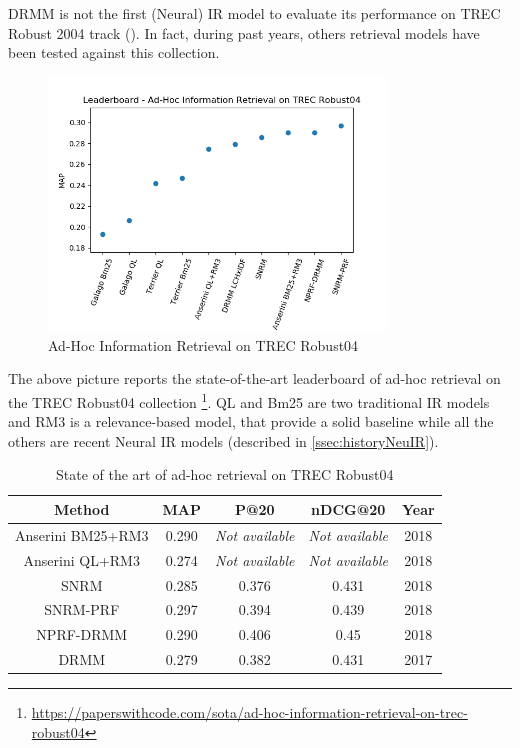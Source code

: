DRMM is not the first (Neural) IR model to evaluate its performance on TREC Robust 2004 track (\cite{rob04}). In fact, during past years, others retrieval models have been tested against this collection.

\begin{figure}[H]
  \centering
  \includegraphics[width=0.8\textwidth]{res/img/EvalRobust04.png}
  \caption{Ad-Hoc Information Retrieval on TREC Robust04}
  \label{fig:evalRob04}
\end{figure}

The above picture reports the state-of-the-art leaderboard of ad-hoc retrieval on the TREC Robust04 collection \footnote{\url{https://paperswithcode.com/sota/ad-hoc-information-retrieval-on-trec-robust04}}.
QL and Bm25 are two traditional IR models and RM3 is a relevance-based model, that provide a solid baseline while all the others are recent Neural IR models (described in \ref{ssec:historyNeuIR}).

\begin{table}[H]
\centering
\begin{tabular}{ccccc}
\textbf{Method} & \textbf{MAP} & \textbf{P@20} & \textbf{nDCG@20} & \textbf{Year} \\ \hline
Anserini BM25+RM3 & 0.290 & \textit{Not available} & \textit{Not available} & 2018 \\ \hline
Anserini QL+RM3 & 0.274 & \textit{Not available} & \textit{Not available} & 2018 \\ \hline
SNRM & 0.285 & 0.376 & 0.431 & 2018 \\ \hline
SNRM-PRF & 0.297 & 0.394 & 0.439 & 2018 \\ \hline
NPRF-DRMM & 0.290 & 0.406 & 0.45 & 2018 \\ \hline
DRMM & 0.279 & 0.382 & 0.431 & 2017 \\ \hline
\end{tabular}
\caption{State of the art of ad-hoc retrieval on TREC Robust04}
\label{table:leaderboardRob04}
\end{table}


